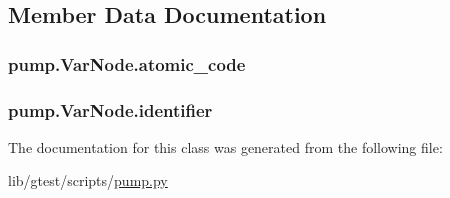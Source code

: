 \subsection{Member Data Documentation}
\hypertarget{classpump_1_1_var_node_ad6bef6a8577b994fbe9ccddf3c82d2fc}{
\subsubsection[{atomic\-\_\-code}]{\setlength{\rightskip}{0pt plus 5cm}pump.\-Var\-Node.\-atomic\-\_\-code}}\label{classpump_1_1_var_node_ad6bef6a8577b994fbe9ccddf3c82d2fc}
\hypertarget{classpump_1_1_var_node_aa2b634e2443646c3754f2d193efa4dc7}{
\subsubsection[{identifier}]{\setlength{\rightskip}{0pt plus 5cm}pump.\-Var\-Node.\-identifier}}\label{classpump_1_1_var_node_aa2b634e2443646c3754f2d193efa4dc7}


The documentation for this class was generated from the following file\-:\begin{DoxyCompactItemize}
\item 
lib/gtest/scripts/\hyperlink{pump_8py}{pump.\-py}\end{DoxyCompactItemize}
